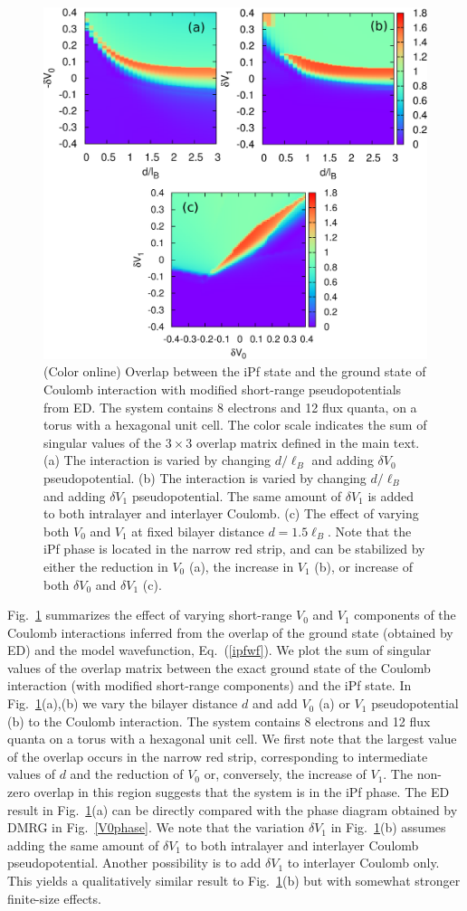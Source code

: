 \begin{figure}%
	\includegraphics[width=0.6\linewidth]{figures/overlap_ED.eps}
	\caption{%
		(Color online)
		Overlap between the iPf state and the ground state of Coulomb interaction with modified short-range pseudopotentials from ED.
		The system contains 8 electrons and 12 flux quanta, on a torus with a hexagonal unit cell. The color scale indicates the sum of singular values of the $3\times3$ overlap matrix defined in the main text.
		(a) The interaction is varied by changing $d/\ell_B$ and adding $\delta V_0$ pseudopotential.
		(b) The interaction is varied by changing $d/\ell_B$ and adding $\delta V_1$ pseudopotential. The same amount of $\delta V_1$ is added to both intralayer and interlayer Coulomb. 
		(c) The effect of varying both $V_0$ and $V_1$ at fixed bilayer distance $d=1.5\ell_B$. Note that the iPf phase is located in the narrow red strip, and can be stabilized by either the reduction in $V_0$ (a), the increase in $V_1$ (b), or increase of both $\delta V_0$ and $\delta V_1$ (c).		
	}
	\label{overlap}
\end{figure}
Fig.~\ref{overlap} summarizes the effect of varying short-range $V_0$ and $V_1$ components of the Coulomb interactions inferred from the overlap of the ground state (obtained by ED) and the model wavefunction, Eq.~(\ref{ipfwf}). 
We plot the sum of singular values of the overlap matrix between the exact ground state of the Coulomb interaction (with modified short-range components) and the iPf state. In Fig.~\ref{overlap}(a),(b) we vary the bilayer distance $d$ and add $V_0$ (a) or $V_1$ pseudopotential (b) to the Coulomb interaction. The system contains 8 electrons and 12 flux quanta on a torus with a hexagonal unit cell.
We first note that the largest value of the overlap occurs in the narrow red strip, corresponding to intermediate values of $d$ and the reduction of $V_0$ or, conversely, the increase of $V_1$. The non-zero overlap in this region suggests that the system is in the iPf phase.
The ED result in Fig.~\ref{overlap}(a) can be directly compared with the phase diagram obtained by DMRG in Fig.~\ref{V0phase}.
We note that the variation $\delta V_1$ in Fig.~\ref{overlap}(b) assumes adding the same amount of $\delta V_1$ to both intralayer and interlayer Coulomb pseudopotential. Another possibility is to add $\delta V_1$ to interlayer Coulomb only. This yields a qualitatively similar result to Fig.~\ref{overlap}(b) but with somewhat stronger finite-size effects.

